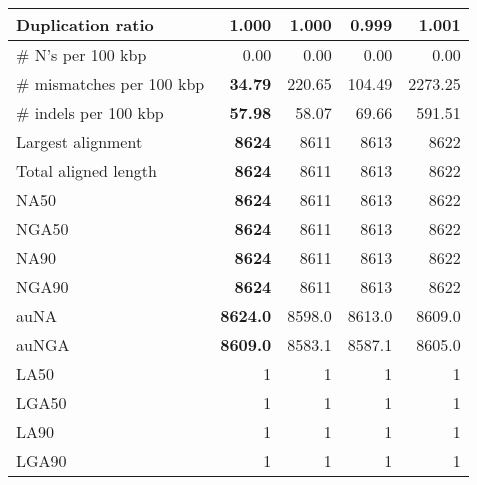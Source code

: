 \documentclass[12pt,a4paper]{article}
\begin{document}
\begin{table}[ht]
\begin{center}
\begin{tabular}{|l*{4}{|r}|}
Duplication ratio & 1.000 & 1.000 & {\bf 0.999} & 1.001 \\ \hline
\# N's per 100 kbp & 0.00 & 0.00 & 0.00 & 0.00 \\ \hline
\# mismatches per 100 kbp & {\bf 34.79} & 220.65 & 104.49 & 2273.25 \\ \hline
\# indels per 100 kbp & {\bf 57.98} & 58.07 & 69.66 & 591.51 \\ \hline
Largest alignment & {\bf 8624} & 8611 & 8613 & 8622 \\ \hline
Total aligned length & {\bf 8624} & 8611 & 8613 & 8622 \\ \hline
NA50 & {\bf 8624} & 8611 & 8613 & 8622 \\ \hline
NGA50 & {\bf 8624} & 8611 & 8613 & 8622 \\ \hline
NA90 & {\bf 8624} & 8611 & 8613 & 8622 \\ \hline
NGA90 & {\bf 8624} & 8611 & 8613 & 8622 \\ \hline
auNA & {\bf 8624.0} & 8598.0 & 8613.0 & 8609.0 \\ \hline
auNGA & {\bf 8609.0} & 8583.1 & 8587.1 & 8605.0 \\ \hline
LA50 & 1 & 1 & 1 & 1 \\ \hline
LGA50 & 1 & 1 & 1 & 1 \\ \hline
LA90 & 1 & 1 & 1 & 1 \\ \hline
LGA90 & 1 & 1 & 1 & 1 \\ \hline
\end{tabular}
\end{center}
\end{table}
\end{document}
